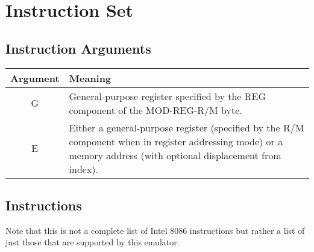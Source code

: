 \section{Instruction Set}
    \label{sec:instructset}
    \subsection{Instruction Arguments}
    \begin{table}[h]
        \begin{tabular} { | c | m{} | }
            \hline
            Argument & Meaning \\
            \hline
            G & General-purpose register specified by the REG component of the MOD-REG-R/M byte. \\
            \hline
            E & Either a general-purpose register (specified by the R/M component when in register addressing mode) or a memory address (with optional displacement from index). \\
            \hline
        \end{tabular}
    \end{table}

    \subsection{Instructions}
        Note that this is not a complete list of Intel 8086 instructions but rather a list of just those that are supported by this emulator.


